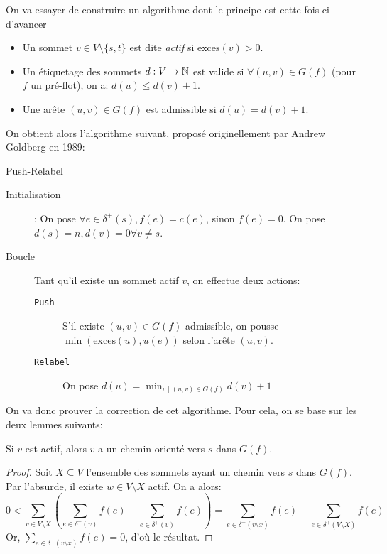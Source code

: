 \documentclass[math, info]{cours}
\begin{document}
On va essayer de construire un algorithme dont le principe est cette fois ci d'avancer
\begin{definition}
	\begin{itemize}
		\item Un sommet $v \in V\setminus \{s, t\}$ est dite \emph{actif} si $\mathrm{exces}(v) > 0$.
		\item Un étiquetage des sommets $d: V \to \mathbb{N}$ est valide si $\forall (u, v) \in G(f)$ (pour $f$ un pré-flot), on a: $d(u) \leq d(v) + 1$.
		\item Une arête $(u, v) \in G(f)$ est admissible si $d(u) = d(v) + 1$.
	\end{itemize}
	\label{def:activenode}
\end{definition}

On obtient alors l'algorithme suivant, proposé originellement par Andrew Goldberg en 1989:
\begin{algorithm}
	\caption{Push-Relabel}
	\label{alg:pushrelabel}
	\begin{description}
		\item[Initialisation]: On pose $\forall e \in \delta^{+}(s), f(e) = c(e)$, sinon $f(e) = 0$.
		      On pose $d(s) = n, d(v) = 0 \forall v \neq s$.
		\item[Boucle] Tant qu'il existe un sommet actif $v$, on effectue deux actions:
		      \begin{description}
			      \item[\tt Push] S'il existe $(u,v) \in G(f)$ admissible, on pousse $\min \left(\mathrm{exces}(u), u(e)\right)$ selon l'arête $(u, v)$.
			      \item[\tt Relabel] On pose $d(u) = \min_{v\mid (u, v) \in G(f)}d(v) + 1$
		      \end{description}
	\end{description}
\end{algorithm}

On va donc prouver la correction de cet algorithme.
Pour cela, on se base sur les deux lemmes suivants:
\begin{lemme}
	Si $v$ est actif, alors $v$ a un chemin orienté vers $s$ dans $G(f)$.
	\label{lem:preflow1}
\end{lemme}
\begin{proof}
	Soit $X \subseteq V$ l'ensemble des sommets ayant un chemin vers $s$ dans $G(f)$.
	Par l'absurde, il existe $w \in V\setminus X$ actif. On a alors:
	\begin{equation*}
		0 < \sum_{v \in V \setminus X} \left(\sum_{e \in \delta^{-}(v)} f(e) - \sum_{e\in \delta^{+}(v)} f(e)\right) = \sum_{e \in \delta^{-}(v\setminus x)} f(e) - \sum_{e\in \delta^{+}(V\setminus X)} f(e)
	\end{equation*}
	Or, $\sum_{e \in \delta^{-}(v\setminus x)} f(e) = 0$, d'où le résultat.
\end{proof}
\end{document}
